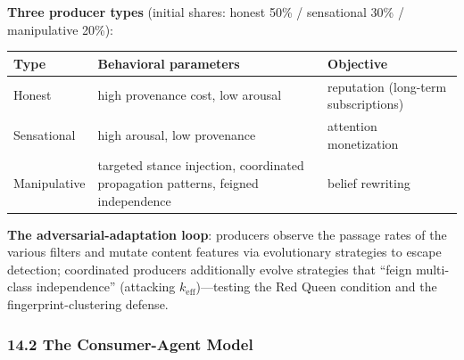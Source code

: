 \documentclass[
  11pt]{article}
\begin{document}
\textbf{Three producer types} (initial shares: honest 50\% / sensational
30\% / manipulative 20\%):

\begin{longtable}[]{@{}
  >{\raggedright\arraybackslash}p{}
  >{\raggedright\arraybackslash}p{}
  >{\raggedright\arraybackslash}p{}@{}}
\toprule\noalign{}
\begin{minipage}[b]{\linewidth}\raggedright
Type
\end{minipage} & \begin{minipage}[b]{\linewidth}\raggedright
Behavioral parameters
\end{minipage} & \begin{minipage}[b]{\linewidth}\raggedright
Objective
\end{minipage} \\
\midrule\noalign{}
\endhead
\bottomrule\noalign{}
\endlastfoot
Honest & high provenance cost, low arousal & reputation (long-term
subscriptions) \\
Sensational & high arousal, low provenance & attention monetization \\
Manipulative & targeted stance injection, coordinated propagation
patterns, feigned independence & belief rewriting \\
\end{longtable}

\textbf{The adversarial-adaptation loop}: producers observe the passage
rates of the various filters and mutate content features via
evolutionary strategies to escape detection; coordinated producers
additionally evolve strategies that ``feign multi-class independence''
(attacking \(k_{\mathrm{eff}}\))---testing the Red Queen condition and
the fingerprint-clustering defense.

\subsubsection{14.2 The Consumer-Agent
Model}\label{the-consumer-agent-model}
\end{document}
